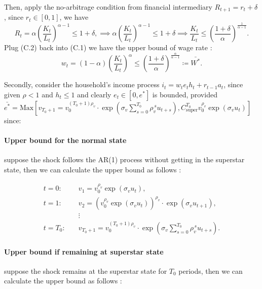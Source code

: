 \documentclass[11pt]{article}
\begin{document}
Then, apply the no-arbitrage condition from financial intermediary $R_{t+1} = r_t + \delta$, since $r_t \in [0,1]$, we have 
\begin{equation}
  R_{t} = \alpha \left( \frac{K_t}{L_t} \right)^{\alpha - 1} \le 1+\delta, 
  \implies \alpha \left( \frac{K_t}{L_t} \right)^{\alpha-1} \le 1+\delta 
  \implies \frac{K_t}{L_t} \le \left(\frac{1+\delta}{\alpha}\right)^{\frac{1}{\alpha-1}}.
\end{equation}
Plug (C.2) back into (C.1) we have the upper bound of wage rate :
\[
 w_t = (1 - \alpha) \left( \frac{K_t}{L_t} \right)^{\alpha} \leq \left( \frac{1+\delta}{\alpha} \right)^{\frac{\alpha}{\alpha-1}} \coloneqq \bar{W^*}.
\]

Secondly, consider the household's income process $i_t = w_t e_t h_t + r_{t-1} a_t$, since given $\rho<1$ and $h_t \leq 1$ and clearly $e_t \in [0, e^{*}]$ is bounded, provided 
$\bar{e^*} = \text{Max} \left[v_{T_0+1} = v_{0}^{(T_0+1)\rho_v} 
\cdot \exp\!\left(\sigma_v \sum_{s=0}^{T_0} \rho_v^{\,s} u_{t+s}\right), 
C_{\text{super}}^{T_0}v_{0}^{\rho_v} \exp\!\left(\sigma_v u_{t}\right)\right] $ since:

\paragraph{Upper bound for the normal state}
suppose the shock follows the AR(1) process without getting in the 
superstar state, then we can calculate the upper bound as follows :

\begin{equation*}
\begin{aligned}
    t = 0: \quad & v_{1} = v_{0}^{\rho_v} \exp\!\left(\sigma_v u_{t}\right), \\
    t = 1: \quad & v_{2} = \left(v_{0}^{\rho_v} \exp\!\left(\sigma_v u_{t}\right)\right)^{\rho_v} 
                    \cdot \exp\!\left(\sigma_v u_{t+1}\right), \\
    & \vdots \\
    t = T_0: \quad & v_{T_0+1} = v_{0}^{(T_0+1)\rho_v} 
      \cdot \exp\!\left(\sigma_v \sum_{s=0}^{T_0} \rho_v^{\,s} u_{t+s}\right).
\end{aligned}
\end{equation*}

\paragraph{Upper bound if remaining at superstar state}
suppose the shock remains at the superstar state for $T_0$ periods, then we can calculate the upper bound as follows :
\end{document}
